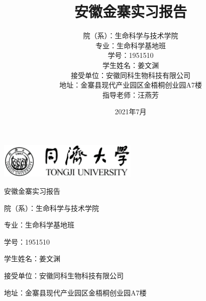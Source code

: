 \documentclass[cn,black,12pt,normal]{elegantnote}
\title{\Huge 安徽金寨实习报告 \vspace*{300pt}}
\author{院（系）：生命科学与技术学院\\专业：生命科学基地班\\学号：1951510\\学生姓名：姜文渊\\接受单位：安徽同科生物科技有限公司\\地址：金寨县现代产业园区金梧桐创业园A7楼\\指导老师：汪燕芳}
\date{2021年7月}
\begin{document}
\begin{titlepage}
    \centering


    \vspace{0.2\textheight}  %
    

    \includegraphics[width=0.5\textwidth]{image/tongji-whole-logo.eps}

    \vspace{0.02\textheight}

    {\Huge 安徽金寨实习报告}

    

    \vspace{0.25\textheight}  %


    \begin{flushleft}
        \hspace{0.3\textwidth}
        院（系）：生命科学与技术学院

        \hspace{0.3\textwidth}
        专业：生命科学基地班

        \hspace{0.3\textwidth}
        学号：1951510

        \hspace{0.3\textwidth}
        学生姓名：姜文渊

        \hspace{0.3\textwidth}
        接受单位：安徽同科生物科技有限公司

        \hspace{0.3\textwidth}
        地址：金寨县现代产业园区金梧桐创业园A7楼


\end{flushleft}
\end{titlepage}
\end{document}
